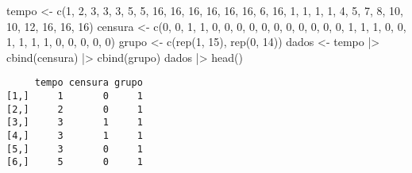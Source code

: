 \documentclass[
  letterpaper,
  DIV=11,
  numbers=noendperiod]{scrreprt}
\newenvironment{Shaded}{\begin{snugshade}}{\end{snugshade}}
\newcommand{\DecValTok}[1]{\textcolor[rgb]{0.68,0.00,0.00}{#1}}
\newcommand{\FunctionTok}[1]{\textcolor[rgb]{0.28,0.35,0.67}{#1}}
\newcommand{\NormalTok}[1]{\textcolor[rgb]{0.00,0.46,0.62}{#1}}
\newcommand{\OtherTok}[1]{\textcolor[rgb]{0.00,0.46,0.62}{#1}}
\newcommand{\SpecialCharTok}[1]{\textcolor[rgb]{0.37,0.37,0.37}{#1}}
\begin{document}
\begin{Shaded}
\begin{Highlighting}[]
\NormalTok{tempo }\OtherTok{\textless{}{-}} \FunctionTok{c}\NormalTok{(}\DecValTok{1}\NormalTok{, }\DecValTok{2}\NormalTok{, }\DecValTok{3}\NormalTok{, }\DecValTok{3}\NormalTok{, }\DecValTok{3}\NormalTok{, }\DecValTok{5}\NormalTok{, }\DecValTok{5}\NormalTok{, }\DecValTok{16}\NormalTok{, }\DecValTok{16}\NormalTok{, }\DecValTok{16}\NormalTok{, }\DecValTok{16}\NormalTok{, }\DecValTok{16}\NormalTok{, }\DecValTok{16}\NormalTok{, }\DecValTok{6}\NormalTok{, }\DecValTok{16}\NormalTok{, }\DecValTok{1}\NormalTok{, }\DecValTok{1}\NormalTok{, }\DecValTok{1}\NormalTok{, }\DecValTok{1}\NormalTok{, }\DecValTok{4}\NormalTok{, }\DecValTok{5}\NormalTok{, }\DecValTok{7}\NormalTok{, }\DecValTok{8}\NormalTok{, }\DecValTok{10}\NormalTok{, }\DecValTok{10}\NormalTok{, }\DecValTok{12}\NormalTok{, }\DecValTok{16}\NormalTok{, }\DecValTok{16}\NormalTok{, }\DecValTok{16}\NormalTok{)}
\NormalTok{censura }\OtherTok{\textless{}{-}} \FunctionTok{c}\NormalTok{(}\DecValTok{0}\NormalTok{, }\DecValTok{0}\NormalTok{, }\DecValTok{1}\NormalTok{, }\DecValTok{1}\NormalTok{, }\DecValTok{0}\NormalTok{, }\DecValTok{0}\NormalTok{, }\DecValTok{0}\NormalTok{, }\DecValTok{0}\NormalTok{, }\DecValTok{0}\NormalTok{, }\DecValTok{0}\NormalTok{, }\DecValTok{0}\NormalTok{, }\DecValTok{0}\NormalTok{, }\DecValTok{0}\NormalTok{, }\DecValTok{0}\NormalTok{, }\DecValTok{0}\NormalTok{, }\DecValTok{1}\NormalTok{, }\DecValTok{1}\NormalTok{, }\DecValTok{1}\NormalTok{, }\DecValTok{0}\NormalTok{, }\DecValTok{0}\NormalTok{, }\DecValTok{1}\NormalTok{, }\DecValTok{1}\NormalTok{, }\DecValTok{1}\NormalTok{, }\DecValTok{1}\NormalTok{, }\DecValTok{0}\NormalTok{, }\DecValTok{0}\NormalTok{, }\DecValTok{0}\NormalTok{, }\DecValTok{0}\NormalTok{, }\DecValTok{0}\NormalTok{)}
\NormalTok{grupo }\OtherTok{\textless{}{-}} \FunctionTok{c}\NormalTok{(}\FunctionTok{rep}\NormalTok{(}\DecValTok{1}\NormalTok{, }\DecValTok{15}\NormalTok{), }\FunctionTok{rep}\NormalTok{(}\DecValTok{0}\NormalTok{, }\DecValTok{14}\NormalTok{))}
\NormalTok{dados }\OtherTok{\textless{}{-}}\NormalTok{ tempo  }\SpecialCharTok{|\textgreater{}} 
            \FunctionTok{cbind}\NormalTok{(censura)  }\SpecialCharTok{|\textgreater{}} 
            \FunctionTok{cbind}\NormalTok{(grupo)}
\NormalTok{dados  }\SpecialCharTok{|\textgreater{}} 
        \FunctionTok{head}\NormalTok{()}
\end{Highlighting}
\end{Shaded}

\begin{verbatim}
     tempo censura grupo
[1,]     1       0     1
[2,]     2       0     1
[3,]     3       1     1
[4,]     3       1     1
[5,]     3       0     1
[6,]     5       0     1
\end{verbatim}
\end{document}

